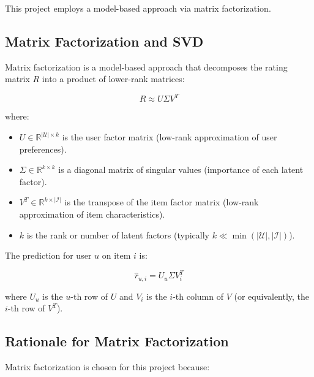 This project employs a model-based approach via matrix factorization.

\subsection{Matrix Factorization and SVD}

Matrix factorization is a model-based approach that decomposes the rating matrix $R$ into a product of 
lower-rank matrices:

\[
  R \approx U \Sigma V^T
\]

where:
\begin{itemize}
  \item $U \in \mathbb{R}^{|\mathcal{U}| \times k}$ is the user factor matrix (low-rank approximation of user preferences).
  \item $\Sigma \in \mathbb{R}^{k \times k}$ is a diagonal matrix of singular values (importance of each latent factor).
  \item $V^T \in \mathbb{R}^{k \times |\mathcal{I}|}$ is the transpose of the item factor matrix (low-rank approximation of item characteristics).
  \item $k$ is the rank or number of latent factors (typically $k \ll \min(|\mathcal{U}|, |\mathcal{I}|)$).
\end{itemize}

The prediction for user $u$ on item $i$ is:

\[
  \hat{r}_{u,i} = U_u \Sigma V_i^T
\]

where $U_u$ is the $u$-th row of $U$ and $V_i$ is the $i$-th column of $V$ (or equivalently, the $i$-th row of $V^T$).

\subsection{Rationale for Matrix Factorization}

Matrix factorization is chosen for this project because:

